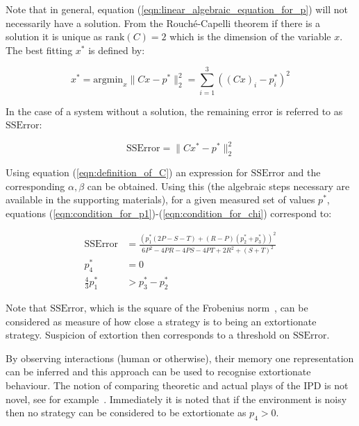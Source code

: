 \documentclass[a4paper]{article}
\begin{document}
Note that in general, equation (\ref{eqn:linear_algebraic_equation_for_p}) will
not necessarily have a solution. From the Rouch\'{e}-Capelli theorem if there is
a solution it is unique as \(\text{rank}(C)=2\) which is the dimension of the
variable \(x\). The best fitting \(x^*\) is defined by:

\begin{equation}\label{eqn:x_star}
    x^* = \text{argmin}_{x}\|C x- p^*\|_2^2 = \sum_{i=1}^{3}\left((C x)_i-p_i^*\right)^2
\end{equation}

In the case of a system without a solution, the remaining error is referred to
as \(\text{SSError}\):

\begin{equation}\label{eqn:r_squared}
    \text{SSError} = \|C x^*- p^*\|_2^2
\end{equation}

Using equation (\ref{eqn:definition_of_C}) an expression for  \(\text{SSError}\)
and the corresponding \(\alpha, \beta\) can be obtained. Using this (the
algebraic steps necessary are available in the supporting materials), for a
given measured set of values \(p^*\), equations
(\ref{eqn:condition_for_p1})-(\ref{eqn:condition_for_chi}) correspond to:

\begin{align}
    \text{SSError}   & =
    \frac{\left(p_1^* (2P-S-T) + (R-P)(p_2^* + p_3^*)\right) ^ 2}
    {6P^2 - 4PR -4PS -4PT + 2R^2 + (S + T) ^2}  \label{eqn:measured_SSError}\\
    p_4^*            & = 0 \label{eqn:measured_condition_for_p4}\\
    \frac{4}{3}p^*_1 & > p^*_3 - p_2^*\label{eqn:measured_condition_for_chi}
\end{align}

Note that \(\text{SSError}\), which is the square of the Frobenius
norm~\cite{Golub2013}, can be considered as measure of how close a strategy is
to being an extortionate strategy. Suspicion of extortion then corresponds to a
threshold on \(\text{SSError}\).

By observing interactions (human or otherwise), their memory one representation
can be inferred and this approach can be used to recognise extortionate
behaviour. The notion of comparing theoretic and actual plays of the IPD is not
novel, see for example~\cite{Rand2013}. Immediately it is noted that if the
environment is noisy~\cite{Wu1995} then no strategy can be considered to be
extortionate as \(p_4>0\).
\end{document}

